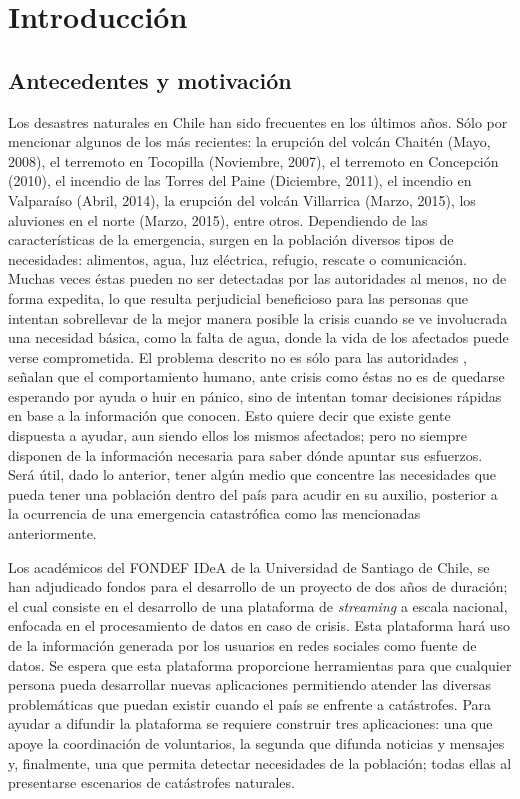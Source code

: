 \chapter{Introducción}
\label{cap:introduccion}

\section{Antecedentes y motivación}
\label{intro:motivacion}

Los desastres naturales en Chile han sido frecuentes en los últimos años. Sólo por mencionar algunos de los más recientes: la erupción del volcán Chaitén (Mayo, 2008), el terremoto en Tocopilla (Noviembre, 2007), el terremoto en Concepción (2010), el incendio de las Torres del Paine (Diciembre, 2011), el incendio en Valparaíso (Abril, 2014), la erupción del volcán Villarrica (Marzo, 2015), los aluviones en el norte (Marzo, 2015), entre otros. Dependiendo de las características de la emergencia, surgen en la población diversos tipos de necesidades: alimentos, agua, luz eléctrica, refugio, rescate o comunicación. Muchas veces éstas pueden no ser detectadas por las autoridades al menos, no de forma expedita, lo que resulta perjudicial beneficioso para las personas que intentan sobrellevar de la mejor manera posible la crisis cuando se ve involucrada una necesidad básica, como la falta de agua, donde la vida de los afectados puede verse comprometida. El problema descrito no es sólo para las autoridades \cite{ChatoSurvey}, señalan que el comportamiento humano, ante crisis como éstas no es de quedarse esperando por ayuda o huir en pánico, sino de intentan tomar decisiones rápidas en base a la información que conocen. Esto quiere decir que existe gente dispuesta a ayudar, aun siendo ellos los mismos afectados; pero no siempre disponen de la información necesaria para saber dónde apuntar sus esfuerzos. Será útil, dado lo anterior, tener algún medio que concentre las necesidades que pueda tener una población dentro del país para acudir en su auxilio, posterior a la ocurrencia de una emergencia catastrófica como las mencionadas anteriormente.

Los académicos del FONDEF IDeA de la Universidad de Santiago de Chile, se han adjudicado fondos para el desarrollo de un proyecto de dos años de duración; el cual consiste en el desarrollo de una plataforma de \textit{streaming} a escala nacional, enfocada en el procesamiento de datos en caso de crisis. Esta plataforma hará uso de la información generada por los usuarios en redes sociales como fuente de datos. Se espera que esta plataforma proporcione herramientas para que cualquier persona pueda desarrollar nuevas aplicaciones permitiendo atender las diversas problemáticas que puedan existir cuando el país se enfrente a catástrofes. Para ayudar a difundir la plataforma se requiere construir tres aplicaciones: una que apoye la coordinación de voluntarios, la segunda que difunda noticias y mensajes y, finalmente, una que permita detectar necesidades de la población; todas ellas al presentarse escenarios de catástrofes naturales.

